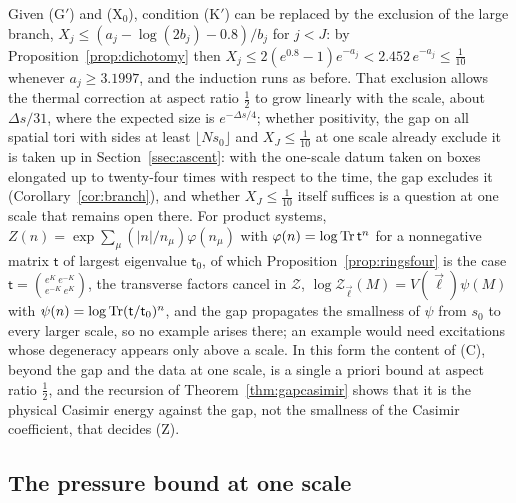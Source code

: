 Given (G$'$) and (X$_0$), condition (K$'$) can be replaced by the exclusion
of the large branch, $X_j\le(a_j-\log(2b_j)-0.8)/b_j$ for $j<J$: by
Proposition~\ref{prop:dichotomy} then $X_j\le2(e^{0.8}-1)e^{-a_j}<2.452\,
e^{-a_j}\le\frac1{10}$ whenever $a_j\ge3.1997$, and the induction runs as
before. That exclusion allows the thermal correction at aspect ratio
$\frac12$ to grow linearly with the scale, about $\Delta s/31$, where the
expected size is $e^{-\Delta s/4}$; whether positivity, the gap on all
spatial tori with sides at least $\lfloor Ns_0\rfloor$ and $X_J\le\frac1{10}$
at one scale already exclude it is taken up in Section~\ref{ssec:ascent}:
with the one-scale datum taken on boxes elongated up to twenty-four times
with respect to the time, the gap excludes it (Corollary~\ref{cor:branch}),
and whether $X_J\le\frac1{10}$ itself suffices is a question at one scale
that remains open there. For product systems,
$Z(n)=\exp\sum_\mu(|n|/n_\mu)\varphi(n_\mu)$ with $\varphi(n)=\log\operatorname{Tr}
\mathsf t^n$ for a nonnegative matrix $\mathsf t$ of largest eigenvalue $\mathsf t_0$, of which Proposition~\ref{prop:ringsfour} is the case $\mathsf t=\binom{e^K\ e^{-K}}{e^{-K}\ e^K}$, the transverse factors
cancel in $\mathcal Z$, $\log\mathcal Z_{\vec\ell}(M)=V(\vec\ell)\psi(M)$
with $\psi(n)=\log\operatorname{Tr}(\mathsf t/\mathsf t_0)^n$, and the gap propagates the
smallness of $\psi$ from $s_0$ to every larger scale, so no example arises
there; an example would need excitations whose degeneracy appears only
above a scale. In this form the content of (C), beyond the gap and the
data at one scale, is a single a priori bound at aspect ratio $\frac12$,
and the recursion of Theorem~\ref{thm:gapcasimir} shows that it is the
physical Casimir energy against the gap, not the smallness of the Casimir
coefficient, that decides (Z).

\subsection{The pressure bound at one scale}\label{ssec:pressure}

